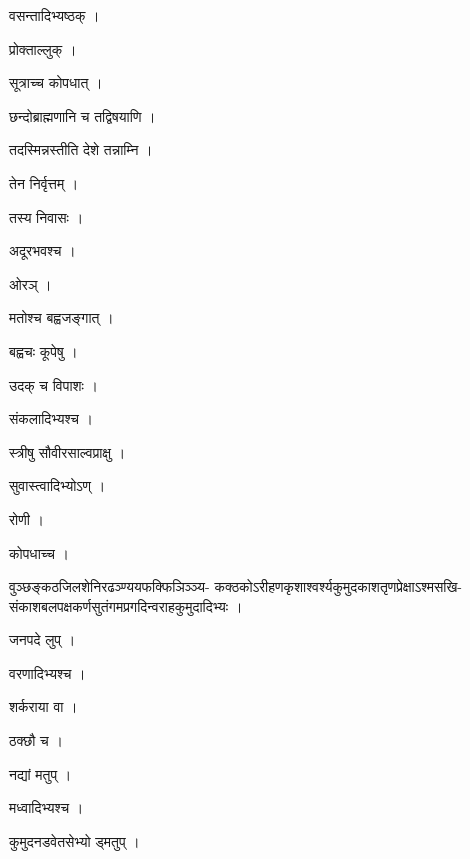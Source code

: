\documentclass[10pt, openany]{book}
\begin{document}
\noindent वसन्तादिभ्यष्ठक् ।

\noindent प्रोक्ताल्लुक् ।

\noindent सूत्राच्च कोपधात् ।

\noindent छन्दोब्राह्मणानि च तद्विषयाणि ।

\noindent तदस्मिन्नस्तीति देशे तन्नाम्नि ।

\noindent तेन निर्वृत्तम् ।

\noindent तस्य निवासः ।

\noindent अदूरभवश्च ।

\noindent ओरञ् ।

\noindent मतोश्च बह्वजङ्गात् ।

\noindent बह्वचः कूपेषु ।

\noindent उदक् च विपाशः ।

\noindent संकलादिभ्यश्च ।

\noindent स्त्रीषु सौवीरसाल्वप्राक्षु ।

\noindent सुवास्त्वादिभ्योऽण् ।

\noindent रोणी ।

\noindent कोपधाच्च ।

\noindent वुञ्छङ्कठजिलशेनिरढञ्ण्ययफक्फिञिञ्ञ्य- कक्ठकोऽरीहणकृशाश्वर्श्यकुमुदकाशतृणप्रेक्षाऽश्मसखि- संकाशबलपक्षकर्णसुतंगमप्रगदिन्वराहकुमुदादिभ्यः ।

\noindent जनपदे लुप् ।

\noindent वरणादिभ्यश्च ।

\noindent शर्कराया वा ।

\noindent ठक्छौ च ।

\noindent नद्यां मतुप् ।

\noindent मध्वादिभ्यश्च ।

\noindent कुमुदनडवेतसेभ्यो ड्मतुप् ।
\end{document}
